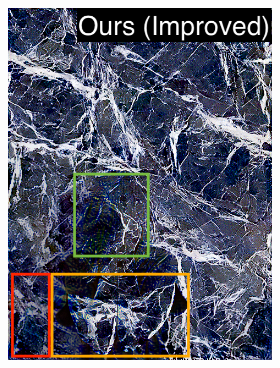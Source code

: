 \begin{figure}[]
\begin{subfigure}{0.6\textwidth}
\begin{subfigure}{0.48\textwidth}
            \includegraphics[width=\textwidth]{images/04-experiment02/human/marble/improved_proj_highlighted2.jpg}
            \caption*{}
        \end{subfigure}
        \hfill
        \begin{subfigure}{0.48\textwidth}
            \centering
            \begin{subfigure}{0.32\textwidth}
                \centering

\end{subfigure}
\end{subfigure}
\end{subfigure}
\end{figure}

